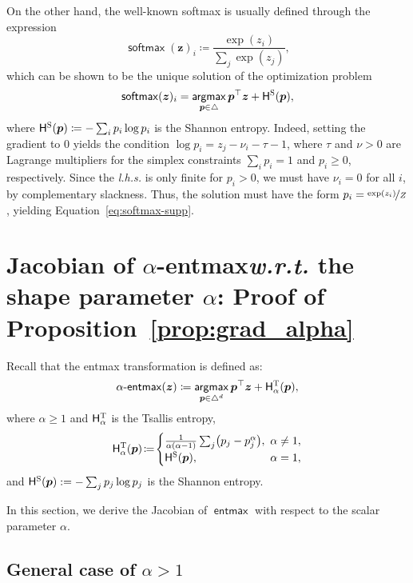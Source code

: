 \documentclass[11pt,a4paper]{article}
\makeatletter
\newcommand*{\wrt}{\textit{w.\hspace{.07em}r\hspace{.07em}.t.}\@\xspace}
\newcommand*{\lhs}{\textit{l.\hspace{.07em}h\hspace{.07em}.s.}\@\xspace}
\newcommand{\simplex}{\triangle}
\newcommand\pp{p}
\newcommand\p{\bm{\pp}}
\newcommand\xx{z}
\newcommand\x{\bm{\xx}}
\newcommand{\eqnref}[1]{Equation~\ref{eq:#1}}
\newcommand{\HHs}{\mathsf{H}^\textsc{S}}
\newcommand{\HHt}{\mathsf{H}^{\textsc{T}}}
\newcommand\thresh{\tau}
\DeclareMathOperator*{\argmax}{\mathsf{argmax}}
\DeclareMathOperator*{\softmax}{\mathsf{softmax}}
\newcommand*\entmaxtext{entmax\xspace}
\DeclareMathOperator*{\entmax}{\mathsf{\entmaxtext}}
\newcommand*\aentmax[1][\alpha]{\mathop{\mathsf{#1}\textnormal{-}\mathsf{\entmaxtext}}}
\makeatother
\begin{document}
On the other hand, the well-known softmax is usually defined through the
expression
\begin{equation}\label{eq:softmax-supp}
\softmax(\x)_i \coloneqq \frac{\exp(\xx_i)}{\sum_j \exp(\xx_j)},
\end{equation}
which can be shown to be the unique solution of the optimization problem
\begin{equation}
\softmax(\x)_i =
\argmax_{\p \in \simplex} \p^\top\x + \HHs(\p),
\end{equation}
where $\HHs(\p) \coloneqq -\sum_i \pp_i \log \pp_i$ is the Shannon entropy.
Indeed, setting the gradient to $0$ yields the condition
$\log \pp_i = \xx_j - \nu_i - \tau - 1$, where $\thresh$ and $\nu > 0$ are Lagrange
multipliers for the simplex constraints $\sum_i \pp_i = 1$ and $\pp_i \geq 0$,
respectively. Since the \lhs is only finite for $\pp_i>0$,
we must have $\nu_i=0$ for all $i$, by complementary
slackness. Thus, the solution must have the form $\pp_i =
\nicefrac{\exp(\xx_i)}{Z}$, yielding \eqnref{softmax-supp}.
\section{Jacobian of {\boldmath $\alpha$}-\entmaxtext \wrt the shape parameter
{\boldmath $\alpha$}:
Proof of Proposition~\ref{prop:grad_alpha}}
\label{sec:alpha_grad}
Recall that the \entmaxtext transformation is defined as:
\begin{equation}\label{eq:entmax_form_supp}
    \aentmax(\bm{z}) \coloneqq
    \argmax_{\p \in \simplex^d} \bm{p}^\top\bm{z} + \HHt_{\alpha}(\bm{p}),
\end{equation}
where $\alpha \geq 1$ and $\HHt_{\alpha}$ is the Tsallis entropy,
\begin{equation}\HHt_{\alpha}(\bm{p})\!\coloneqq\!
\begin{cases}
\frac{1}{\alpha(\alpha-1)}\sum_j\!\left(p_j - p_j^\alpha\right)\!, &
\!\!\!\alpha \ne 1,\\
\HHs(\bm{p}), &
\!\!\!\alpha = 1,
\end{cases}
\end{equation}
and $\HHs(\bm{p}):= -\sum_j p_j \log p_j$ is the Shannon entropy.

In this section, we derive the Jacobian of $\entmax$ with respect to the scalar parameter $\alpha$.

\subsection{General case of {\boldmath $\alpha>1$}}
\end{document}
